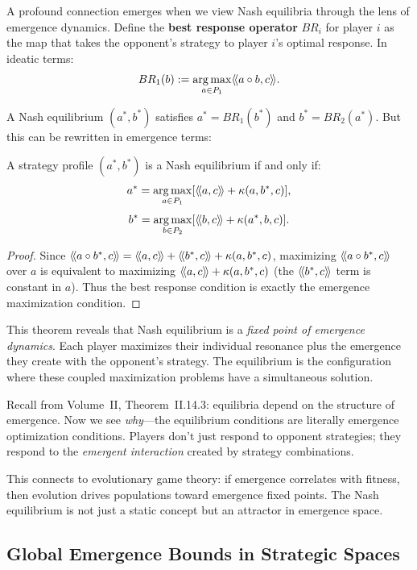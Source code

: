 A profound connection emerges when we view Nash equilibria through the lens
of emergence dynamics. Define the \textbf{best response operator} $BR_i$ for
player $i$ as the map that takes the opponent's strategy to player $i$'s
optimal response. In ideatic terms:
\[
  BR_1(b) := \operatorname*{arg\,max}_{a \in P_1} \langle\!\langle a \circ b, c \rangle\!\rangle.
\]

A Nash equilibrium $(a^*, b^*)$ satisfies $a^* = BR_1(b^*)$ and $b^* = BR_2(a^*)$.
But this can be rewritten in emergence terms:

\begin{theorem}
\label{thm:nash-emergence-fixed-point}
A strategy profile $(a^*, b^*)$ is a Nash equilibrium if and only if:
\[
  a^* = \operatorname*{arg\,max}_{a \in P_1} [\langle\!\langle a, c \rangle\!\rangle + \kappa(a, b^*, c)],
\]
\[
  b^* = \operatorname*{arg\,max}_{b \in P_2} [\langle\!\langle b, c \rangle\!\rangle + \kappa(a^*, b, c)].
\]
\end{theorem}

\begin{proof}
Since $\langle\!\langle a \circ b^*, c \rangle\!\rangle = \langle\!\langle a, c \rangle\!\rangle + \langle\!\langle b^*, c \rangle\!\rangle + \kappa(a, b^*, c)$,
maximizing $\langle\!\langle a \circ b^*, c \rangle\!\rangle$ over $a$ is equivalent to maximizing
$\langle\!\langle a, c \rangle\!\rangle + \kappa(a, b^*, c)$ (the $\langle\!\langle b^*, c \rangle\!\rangle$ term is constant in $a$).
Thus the best response condition is exactly the emergence maximization condition.
\end{proof}

\begin{interpretation}
This theorem reveals that Nash equilibrium is a \emph{fixed point of emergence
dynamics}. Each player maximizes their individual resonance plus the emergence
they create with the opponent's strategy. The equilibrium is the configuration
where these coupled maximization problems have a simultaneous solution.

Recall from Volume~II, Theorem~II.14.3: equilibria depend on the structure of
emergence. Now we see \emph{why}---the equilibrium conditions are literally
emergence optimization conditions. Players don't just respond to opponent
strategies; they respond to the \emph{emergent interaction} created by strategy
combinations.

This connects to evolutionary game theory: if emergence correlates with fitness,
then evolution drives populations toward emergence fixed points. The Nash
equilibrium is not just a static concept but an attractor in emergence space.
\end{interpretation}

\subsection{Global Emergence Bounds in Strategic Spaces}

